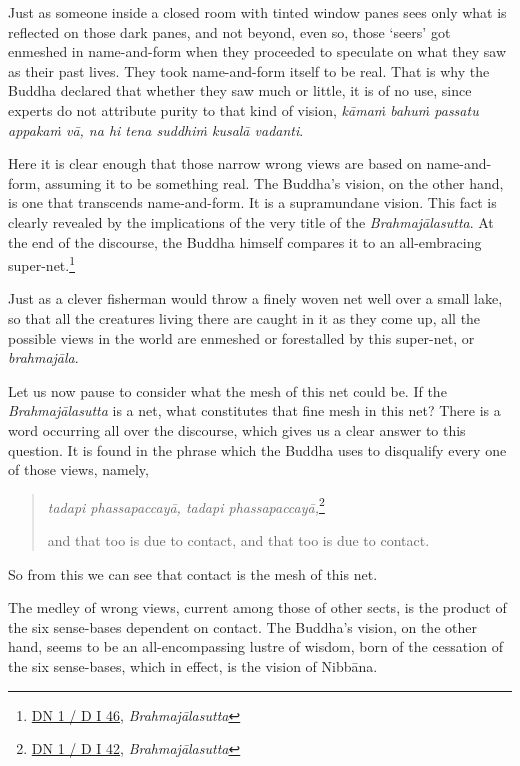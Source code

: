 Just as someone inside a closed room with tinted window panes sees only what is reflected on those dark panes, and not beyond, even so, those `seers' got enmeshed in name-and-form when they proceeded to speculate on what they saw as their past lives. They took name-and-form itself to be real. That is why the Buddha declared that whether they saw much or little, it is of no use, since experts do not attribute purity to that kind of vision, \emph{kāmaṁ bahuṁ passatu appakaṁ vā, na hi tena suddhiṁ kusalā vadanti}.

Here it is clear enough that those narrow wrong views are based on name-and-form, assuming it to be something real. The Buddha's vision, on the other hand, is one that transcends name-and-form. It is a supramundane vision. This fact is clearly revealed by the implications of the very title of the \emph{Brahmajālasutta}. At the end of the discourse, the Buddha himself compares it to an all-embracing super-net.\footnote{\href{https://suttacentral.net/dn1/pli/ms}{DN 1 / D I 46}, \emph{Brahmajālasutta}}

Just as a clever fisherman would throw a finely woven net well over a small lake, so that all the creatures living there are caught in it as they come up, all the possible views in the world are enmeshed or forestalled by this super-net, or \emph{brahmajāla}.

Let us now pause to consider what the mesh of this net could be. If the \emph{Brahmajālasutta} is a net, what constitutes that fine mesh in this net? There is a word occurring all over the discourse, which gives us a clear answer to this question. It is found in the phrase which the Buddha uses to disqualify every one of those views, namely,

\begin{quote}
\emph{tadapi phassapaccayā, tadapi phassapaccayā,}\footnote{\href{https://suttacentral.net/dn1/pli/ms}{DN 1 / D I 42}, \emph{Brahmajālasutta}}

and that too is due to contact, and that too is due to contact.
\end{quote}

So from this we can see that contact is the mesh of this net.

The medley of wrong views, current among those of other sects, is the product of the six sense-bases dependent on contact. The Buddha's vision, on the other hand, seems to be an all-encompassing lustre of wisdom, born of the cessation of the six sense-bases, which in effect, is the vision of Nibbāna.

